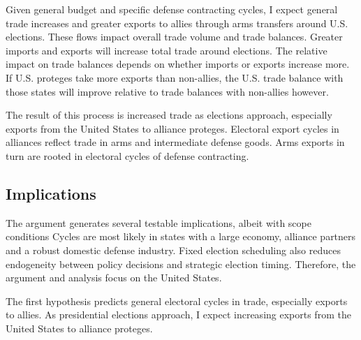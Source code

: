 \documentclass[12pt]{article}
\begin{document}
\begin{table}
\caption{Summary of the process}
\label{fig:arg-process}
\end{table}


Given general budget and specific defense contracting cycles, I expect general trade increases and greater exports to allies through arms transfers around U.S. elections.
These flows impact overall trade volume and trade balances.
Greater imports and exports will increase total trade around elections. 
The relative impact on trade balances depends on whether imports or exports increase more. 
If U.S. proteges take more exports than non-allies, the U.S. trade balance with those states will improve relative to trade balances with non-allies however.


The result of this process is increased trade as elections approach, especially exports from the United States to alliance proteges.
Electoral export cycles in alliances reflect trade in arms and intermediate defense goods. 
Arms exports in turn are rooted in electoral cycles of defense contracting.



\subsection{Implications}



The argument generates several testable implications, albeit with scope conditions 
Cycles are most likely in states with a large economy, alliance partners and a robust domestic defense industry. 
Fixed election scheduling also reduces endogeneity between policy decisions and strategic election timing.
Therefore, the argument and analysis focus on the United States. 


The first hypothesis predicts general electoral cycles in trade, especially exports to allies. 
As presidential elections approach, I expect increasing exports from the United States to alliance proteges.
\end{document}
